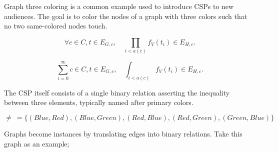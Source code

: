 \begin{comment}

\begin{betterpython}
    def even_constraint(last_state, next_state_var, solver):
        n = solver.IntVar(0, solver.infinity(), 'n_even')
        b = solver.BoolVar('b_even')
        solver.Add(next_state_var - 2 * n <= M * (1 - b))
        solver.Add(next_state_var - 2 * n >= -M * (1 - b))
        return [(b, 1)]
\end{betterpython}

\begin{lstlisting}{python}
    def odd_constraint(last_state, next_state_var, solver):
        n = solver.IntVar(0, solver.infinity(), 'n_odd')
        b = solver.BoolVar('b_odd')
        solver.Add(next_state_var - 2 * n - 1 <= M * (1 - b))
        solver.Add(next_state_var - 2 * n - 1 >= -M * (1 - b))
        return [(b, 1)]
\end{lstlisting}

\end{comment}
Graph three coloring is a common example used to introduce CSPs to new audiences. The goal is to color the nodes of a graph with three colors such that no two same-colored nodes touch. 

\begin{equation}
    \forall c \in C, t \in E_{G, c}, \quad \prod_{i<a(c)} f_V(t_i) \in E_{H, c}.    
\end{equation}


\begin{equation}
    \sum_{i=0}^\infty c \in C, t \in E_{G, c}, \quad \int_{i<a(c)} f_V(t_i) \in E_{H, c}.    
\end{equation}

The CSP itself consists of a single binary relation asserting the inequality between three elements, typically named after primary colors.

\begin{equation}\label{equation:three-color-neq-def}
  \neq\ = \{ (\mathit{Blue}, \mathit{Red}), (\mathit{Blue}, \mathit{Green}), (\mathit{Red}, \mathit{Blue}), (\mathit{Red}, \mathit{Green}), (\mathit{Green}, \mathit{Blue}) \}
\end{equation}

Graphs become instances by translating edges into binary relations. Take this graph as an example;

\begin{center}
\end{center}

